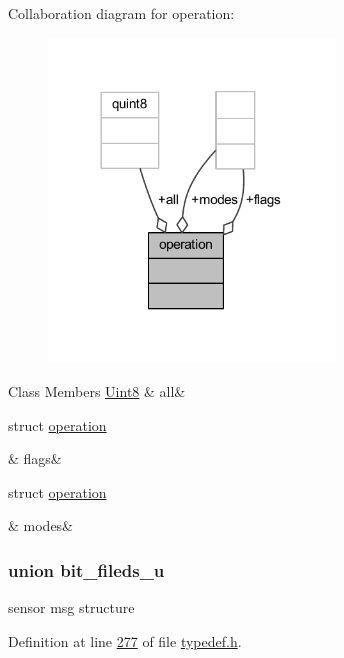 Collaboration diagram for operation\+:
\nopagebreak
\begin{figure}[H]
\begin{center}
\leavevmode
\includegraphics[width=216pt]{d0/d27/a00239}
\end{center}
\end{figure}
\begin{DoxyFields}{Class Members}
\hypertarget{a00001_a530adf1f22ea16e4a66d3a321c55b82d}{\hyperlink{a00001_a979e3e23b9a449e69ab6a8a83b6042f8}{Uint8}}\label{a00001_a530adf1f22ea16e4a66d3a321c55b82d}
&
all&
\\
\hline

\hypertarget{a00001_aa7667e67bf46b36c32db8d20755ab819}{struct \hyperlink{a00001_da/d82/a00091}{operation}}\label{a00001_aa7667e67bf46b36c32db8d20755ab819}
&
flags&
\\
\hline

\hypertarget{a00001_aa87fcb49ea0b9d74644322832af7720d}{struct \hyperlink{a00001_d1/dc1/a00092}{operation}}\label{a00001_aa87fcb49ea0b9d74644322832af7720d}
&
modes&
\\
\hline

\end{DoxyFields}
\label{d9/d2e/a00056}
\hypertarget{a00001_d9/d2e/a00056}{}
\subsubsection{union bit\+\_\+fileds\+\_\+u}
sensor msg structure 

Definition at line \hyperlink{a00001_source_l00277}{277} of file \hyperlink{a00001_source}{typedef.\+h}.



